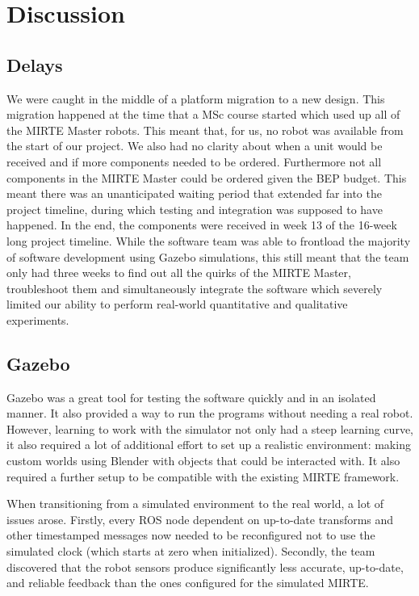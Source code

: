 \section{Discussion}

\subsection{Delays}

We were caught in the middle of a platform migration to a new design. This migration happened at the time that a MSc course started which used up all of the MIRTE Master robots. This meant that, for us, no robot was available from the start of our project. We also had no clarity about when a unit would be received and if more components needed to be ordered. Furthermore not all components in the MIRTE Master could be ordered given the BEP budget. This meant there was an unanticipated waiting period that extended far into the project timeline, during which testing and integration was supposed to have happened. In the end, the components were received in week 13 of the 16-week long project timeline. While the software team was able to frontload the majority of software development using Gazebo simulations, this still meant that the team only had three weeks to find out all the quirks of the MIRTE Master, troubleshoot them and simultaneously integrate the software which severely limited our ability to perform real-world quantitative and qualitative experiments.

\subsection{Gazebo}

Gazebo was a great tool for testing the software quickly and in an isolated manner. It also provided a way to run the programs without needing a real robot. However, learning to work with the simulator not only had a steep learning curve, it also required a lot of additional effort to set up a realistic environment: making custom worlds using Blender with objects that could be interacted with. It also required a further setup to be compatible with the existing MIRTE framework.

When transitioning from a simulated environment to the real world, a lot of issues arose. Firstly, every ROS node dependent on up-to-date transforms and other timestamped messages now needed to be reconfigured not to use the simulated clock (which starts at zero when initialized). Secondly, the team discovered that the robot sensors produce significantly less accurate, up-to-date, and reliable feedback than the ones configured for the simulated MIRTE.

